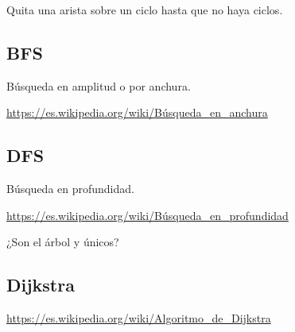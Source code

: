 \documentclass[../main.tex]{subfiles}
\begin{document}
\demostracion
Quita una arista sobre un ciclo hasta que no haya ciclos.

\begin{figure}[H]
	\centering
	
\end{figure}

\subsection{BFS}%
\label{sub:bfs}
Búsqueda en amplitud o por anchura.

\url{https://es.wikipedia.org/wiki/Búsqueda_en_anchura}

\subsection{DFS}%
\label{sub:dfs}
Búsqueda en profundidad.

\url{https://es.wikipedia.org/wiki/Búsqueda_en_profundidad}

¿Son el árbol  y  únicos?

\subsection{Dijkstra}%
\label{sub:dijkstra}

\url{https://es.wikipedia.org/wiki/Algoritmo_de_Dijkstra}

\begin{figure}[H]
	\centering
	
\end{figure}
\end{document}

